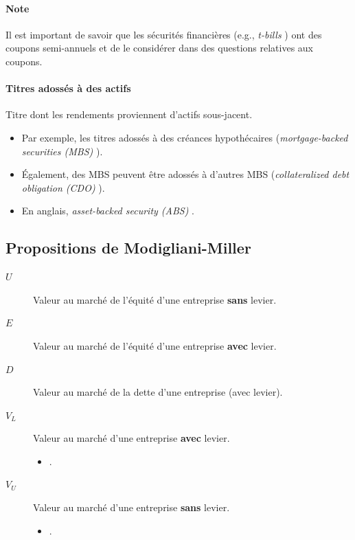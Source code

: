 \documentclass[10pt, french]{article}
\begin{document}
\begin{multicols*}{2}
\paragraph{Note}	Il est important de savoir que les sécurités financières (e.g., \og \textit{t-bills} \fg{}) ont des coupons semi-annuels et de le considérer dans des questions relatives aux coupons.


\paragraph{Titres adossés à des actifs}
\begin{definitionNOHFILL}
Titre dont les rendements proviennent d'actifs sous-jacent.

\begin{itemize}
	\item	Par exemple, les titres adossés à des créances hypothécaires (\og \textit{mortgage-backed securities (MBS)} \fg{}).
	\item	Également, des MBS peuvent être adossés à d'autres MBS (\og \textit{collateralized debt obligation (CDO)} \fg{}).
	\item	En anglais, \og \textit{asset-backed security (ABS)} \fg{}.
\end{itemize}
\end{definitionNOHFILL}


\columnbreak
\subsection{Propositions de Modigliani-Miller}
\begin{distributions}[Notation]
\begin{description}
	\item[$U$]	Valeur au marché de l'équité d'une entreprise \textbf{sans} levier.
	\item[$E$]	Valeur au marché de l'équité d'une entreprise \textbf{avec} levier.
	\item[$D$]	Valeur au marché de la dette d'une entreprise (avec levier).
	\item[$V_{L}$]	Valeur au marché d'une entreprise \textbf{avec} levier.
		\begin{itemize}
		\item	{}.
		\end{itemize}
	\item[$V_{U}$]	Valeur au marché d'une entreprise \textbf{sans} levier.
		\begin{itemize}
		\item	{}.
		\end{itemize}
\end{description}
\end{distributions}


\end{multicols*}
\end{document}
